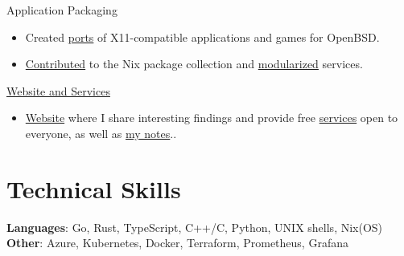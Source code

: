 \documentclass[margin,line]{../res}
\begin{document}
\begin{resume}
	Application Packaging
	\begin{itemize}
		\item Created \href{https://github.com/theobori/openbsd-ports}{ports} of X11-compatible applications and games for OpenBSD.
		\item \href{https://repology.org/maintainer/theo1.bori@epitech.eu}{Contributed} to the Nix package collection and \href{https://github.com/theobori/nix-teeworlds}{modularized} services.
	\end{itemize}

	\href{https://github.com/theobori-cafe}{Website and Services}
	\begin{itemize}
		\item \href{https://theobori.cafe}{Website} where I share interesting findings and provide free \href{https://services.theobori.cafe}{services} open to everyone, as well as \href{https://zettel.theobori.cafe}{my notes}..
	\end{itemize}

	\section{\sc Technical Skills}
	\textbf{Languages}: Go, Rust, TypeScript, C++/C, Python, UNIX shells, Nix(OS)\\
	\textbf{Other}: Azure, Kubernetes, Docker, Terraform, Prometheus, Grafana

\end{resume}
\end{document}
